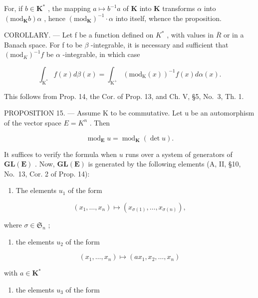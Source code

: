 For, if \(b \in \mathbf{K}^*\) , the mapping \(a \mapsto b^{-1}a\) of \(\mathbf{K}\) into \(\mathbf{K}\) transforms \(\alpha\) into \((\mathrm{mod}_{\mathbf{K}}b)\alpha\) , hence \((\mathrm{mod}_{\mathbf{K}})^{-1} \cdot \alpha\) into itself, whence the proposition.

COROLLARY. --- Let f be a function defined on \(K^{*}\) , with values in \(\overline{R}\) or in a Banach space. For f to be \(\beta\) -integrable, it is necessary and sufficient that \((\mathrm{mod}_K)^{-1}f\) be \(\alpha\) -integrable, in which case

\[
\int_ {\mathrm{K} ^ {*}} f (x) d \beta (x) = \int_ {\mathrm{K} ^ {+}} \left(\mathrm{mod} _ {\mathrm{K}} (x)\right) ^ {- 1} f (x) d \alpha (x).
\]

This follows from Prop. 14, the Cor. of Prop. 13, and Ch. V, §5, No.~3, Th. 1.

PROPOSITION 15. --- Assume K to be commutative. Let u be an automorphism of the vector space \(E = K^{n}\) . Then

\[
\operatorname{mod} _ {\mathbf {E}} u = \operatorname{mod} _ {\mathbf {K}} (\det u).
\]

It suffices to verify the formula when \(u\) runs over a system of generators of \(\mathbf{GL}(\mathbf{E})\) . Now, \(\mathbf{GL}(\mathbf{E})\) is generated by the following elements (A, II, §10, No.~13, Cor. 2 of Prop. 14):

\begin{enumerate}
\def\labelenumi{(\alph{enumi})}
\tightlist
\item
  The elements \(u_{1}\) of the form
\end{enumerate}

\[
\left(x _ {1}, \dots , x _ {n}\right) \mapsto \left(x _ {\sigma (1)}, \dots , x _ {\sigma (n)}\right),
\]

where \(\sigma \in \mathfrak{S}_n\) ;

\begin{enumerate}
\def\labelenumi{(\alph{enumi})}
\setcounter{enumi}{1}
\tightlist
\item
  the elements \(u_{2}\) of the form
\end{enumerate}

\[
\left(x _ {1}, \dots , x _ {n}\right) \mapsto \left(a x _ {1}, x _ {2}, \dots , x _ {n}\right)
\]

with \(a\in \mathbf{K}^*\)

\begin{enumerate}
\def\labelenumi{(\alph{enumi})}
\setcounter{enumi}{2}
\tightlist
\item
  the elements \(u_{3}\) of the form
\end{enumerate}

